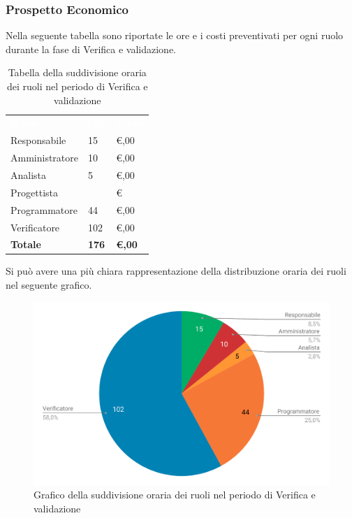 \subsubsection{Prospetto Economico}
Nella seguente tabella sono riportate le ore e i costi preventivati per ogni ruolo durante la fase di Verifica e validazione.


\begin{table}[H]	
	\begin{center}
	    \begin{tabular}{C{4cm}C{1cm}C{3,5cm}}
			\textcolor{white}{\textbf{Ruolo}} & \textcolor{white}{\textbf{Ore}} & \textcolor{white}{\textbf{Costo}}
			\\
			Responsabile & 15 & \euro {},00 \\
			Amministratore & 10 & \euro {},00 \\
			Analista & 5 & \euro {},00 \\
			Progettista &  & \euro \space \\
			Programmatore & 44 & \euro {},00 \\
			Verificatore & 102 & \euro {},00 \\
			\textbf{Totale} & \textbf{176} & \textbf{\euro {},00} \\
		\end{tabular}
	    \caption{Tabella della suddivisione oraria dei ruoli nel periodo di Verifica e validazione} \label{tab:tabellaRuoliVerifica e validazione} 
	\end{center}
\end{table}


Si può avere una più chiara rappresentazione della distribuzione oraria dei ruoli nel seguente grafico.

\begin{figure}[H]
	\includegraphics[width=1\linewidth]{Preventivo/grafici/VV2.pdf}
	\caption{Grafico della suddivisione oraria dei ruoli nel periodo di Verifica e validazione}
\end{figure}

